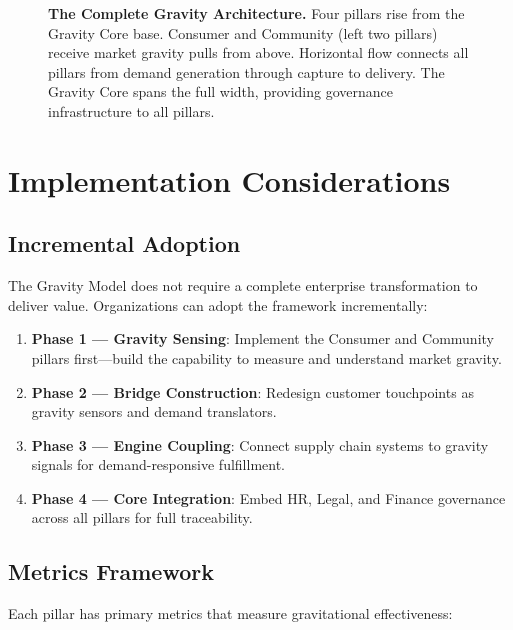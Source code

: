 \documentclass[11pt,a4paper,twocolumn]{article}
\begin{document}
\begin{figure}[t]
{\begin{tikzpicture}
\end{tikzpicture}%
}
\caption{\textbf{The Complete Gravity Architecture.} Four pillars rise from the Gravity Core base. Consumer and Community (left two pillars) receive market gravity pulls from above. Horizontal flow connects all pillars from demand generation through capture to delivery. The Gravity Core spans the full width, providing governance infrastructure to all pillars.}
\label{fig:complete-architecture}
\end{figure}


\section{Implementation Considerations}
\label{sec:implementation}

\subsection{Incremental Adoption}

The Gravity Model does not require a complete enterprise transformation to deliver value. Organizations can adopt the framework incrementally:

\begin{enumerate}[leftmargin=1.5em]
  \item \textbf{Phase 1 --- Gravity Sensing}: Implement the Consumer and Community pillars first---build the capability to measure and understand market gravity.
  \item \textbf{Phase 2 --- Bridge Construction}: Redesign customer touchpoints as gravity sensors and demand translators.
  \item \textbf{Phase 3 --- Engine Coupling}: Connect supply chain systems to gravity signals for demand-responsive fulfillment.
  \item \textbf{Phase 4 --- Core Integration}: Embed HR, Legal, and Finance governance across all pillars for full traceability.
\end{enumerate}

\subsection{Metrics Framework}

Each pillar has primary metrics that measure gravitational effectiveness:
\end{document}
